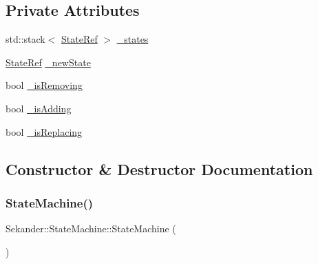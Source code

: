 \subsection*{Private Attributes}
\begin{DoxyCompactItemize}
\item 
std\+::stack$<$ \hyperlink{namespaceSekander_a8503cedf9c863e9f6986eb29f2296f1a}{State\+Ref} $>$ \hyperlink{classSekander_1_1StateMachine_ad630d5fca511f5585824c279dbe11675}{\+\_\+states}
\item 
\hyperlink{namespaceSekander_a8503cedf9c863e9f6986eb29f2296f1a}{State\+Ref} \hyperlink{classSekander_1_1StateMachine_ae2c7d92a467f5aeaade70977e31f82dc}{\+\_\+new\+State}
\item 
bool \hyperlink{classSekander_1_1StateMachine_a40f4cf3657cec4df76f71d28676faf62}{\+\_\+is\+Removing}
\item 
bool \hyperlink{classSekander_1_1StateMachine_afa37f293d874e998209754a8b80c5ae4}{\+\_\+is\+Adding}
\item 
bool \hyperlink{classSekander_1_1StateMachine_a54e53566400e3097faf59d834b53fd21}{\+\_\+is\+Replacing}
\end{DoxyCompactItemize}


\subsection{Constructor \& Destructor Documentation}
\mbox{\label{classSekander_1_1StateMachine_a6cfaf697fb22c18fb44c58577b63639d}} 
\subsubsection{\texorpdfstring{State\+Machine()}{StateMachine()}}
{\footnotesize\ttfamily Sekander\+::\+State\+Machine\+::\+State\+Machine (\begin{DoxyParamCaption}{ }\end{DoxyParamCaption})\hspace{0.3cm}{\ttfamily [inline]}}

\mbox{\label{classSekander_1_1StateMachine_a886e7903bb1c77ba62ec43cc07059a75}} 
